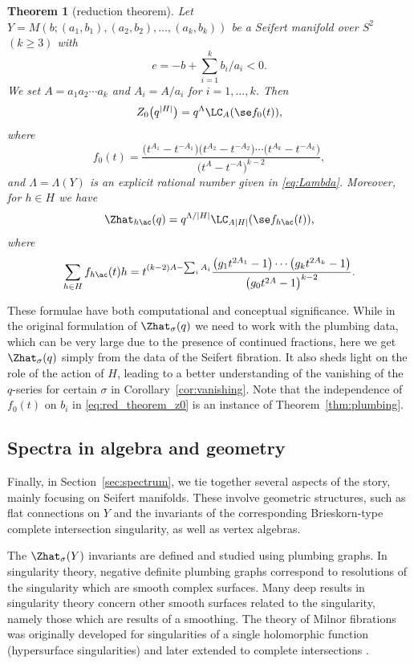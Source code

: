 \documentclass[10pt,a4paper]{amsart}
\newtheorem{Theorem}{Theorem}[section]
\begin{document}
\begin{Theorem}[reduction theorem]
	Let $Y = M(b;(a_1, b_1), (a_2, b_2), \dots, (a_k, b_k))$ be a Seifert manifold over $S^2$ $(k \geq 3)$ with
\[
e=-b+\sum_{i=1}^k b_i/a_i<0.
\]
 We set $A=a_1 a_2\cdots a_k$ and $A_i=A/a_i$ for $i=1,\dots, k$. Then
	\begin{gather}\label{eq:red_theorem_z0}
		Z_0\bigl(q^{|H|}\bigr) = q^\Lambda \LC_A(\se f_0(t)),
	\end{gather}
	where
	\[
		f_0(t) = \frac{\bigl(t^{A_1}-t^{-A_1}\bigr)\bigl(t^{A_2}-t^{-A_2}\bigr)\cdots\bigl(t^{A_k}-t^{-A_k}\bigr)}{\bigl(t^A-t^{-A}\bigr)^{k-2}},
	\]
 and $\Lambda = \Lambda(Y)$ is an explicit rational number given in \eqref{eq:Lambda}.
	Moreover, for $h \in H$ we have
	\[
		\Zhat_{h \ac}(q) = q^{\Lambda/|H|} \LC_{A|H|}(\se f_{h \ac}(t)),
	\]
	where
	\[
		\sum_{h \in H} f_{h \ac}(t)h = t^{(k-2)A - \sum_i A_i}\frac{\bigl(g_1 t^{2A_1}-1\bigr)\cdots\bigl(g_k t^{2A_k}-1\bigr)}{\bigl(g_0 t^{2A}-1\bigr)^{k-2}}.
	\]
\end{Theorem}

These formulae have both computational and conceptual significance. While in the original formulation of $\Zhat_{\sigma}(q)$ we need to work with the plumbing data, which can be very large due to the presence of continued fractions, here we get $\Zhat_{\sigma}(q)$ simply from the data of the Seifert fibration. It also sheds light on the role of the action of $H$, leading to a better understanding of the vanishing of the $q$-series for certain $\sigma$ in Corollary~\ref{cor:vanishing}. Note that the independence of $f_0(t)$ on $b_i$ in \eqref{eq:red_theorem_z0} is an instance of Theorem~\ref{thm:plumbing}.

\subsection{Spectra in algebra and geometry}

Finally, in Section~\ref{sec:spectrum}, we tie together several aspects of the story, mainly focusing on Seifert manifolds. These involve geometric structures, such as flat connections on $Y$ and the invariants of the corresponding Brieskorn-type complete intersection singularity, as well as vertex algebras.

The $\Zhat_{\sigma}(Y)$ invariants are defined and studied using plumbing graphs. In singularity theory, negative definite plumbing graphs correspond to resolutions of the singularity which are smooth complex surfaces. Many deep results in singularity theory concern other smooth surfaces related to the singularity, namely those which are results of a smoothing. The theory of Milnor fibrations was originally developed for singularities of a single holomorphic function (hypersurface singularities) \cite{Mil69} and later extended to complete intersections \cite{Loo84}.
\end{document}

